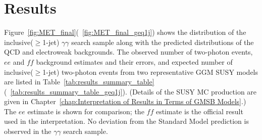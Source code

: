\documentclass[dissertation_bw.tex]{subfiles}
\begin{document}
%
%

\section{Results}
\label{sec:Results}

Figure~\ref{fig:MET_final}(~\ref{fig:MET_final_geq1j}) shows the \MET distribution of the inclusive($\geq$1-jet) $\gamma\gamma$ search sample along with the predicted \MET distributions of the QCD and electroweak backgrounds.  The observed number of two-photon events, $ee$ and $\mathit{ff}$ background estimates and their errors, and expected number of inclusive($\geq$1-jet) two-photon events from two representative GGM SUSY models are listed in Table~\ref{tab:results_summary_table}(~\ref{tab:results_summary_table_geq1j}).  (Details of the SUSY MC production are given in Chapter~\ref{chap:Interpretation of Results in Terms of GMSB Models}.)  The $ee$ estimate is shown for comparison; the $\mathit{ff}$ estimate is the official result used in the interpretation.  No deviation from the Standard Model prediction is observed in the $\gamma\gamma$ search sample.
\end{document}
